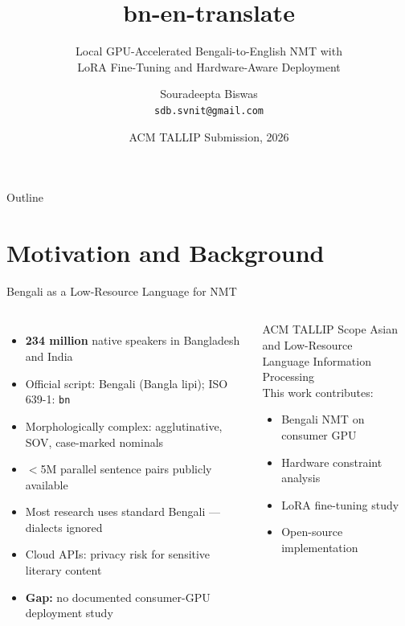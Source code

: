 \documentclass[aspectratio=169,10pt]{beamer}
\title{bn-en-translate}
\subtitle{Local GPU-Accelerated Bengali-to-English NMT with\\
LoRA Fine-Tuning and Hardware-Aware Deployment}
\author{Souradeepta Biswas \\ \texttt{sdb.svnit@gmail.com}}
\institute{M.S. Computer Science, Syracuse University \\ Independent Researcher}
\date{ACM TALLIP Submission, 2026}
\begin{document}
\begin{frame}
  \titlepage
\end{frame}

\begin{frame}{Outline}
  \tableofcontents
\end{frame}

\section{Motivation and Background}

\begin{frame}{Bengali as a Low-Resource Language for NMT}
  \begin{columns}
    \begin{itemize}
      \item \textbf{234 million} native speakers in Bangladesh and India
      \item Official script: Bengali (Bangla lipi); ISO 639-1: \texttt{bn}
      \item Morphologically complex: agglutinative, SOV, case-marked nominals
      \item $<$5M parallel sentence pairs publicly available
      \item Most research uses standard Bengali --- dialects ignored
      \item Cloud APIs: privacy risk for sensitive literary content
      \item \textbf{Gap:} no documented consumer-GPU deployment study
    \end{itemize}
    \begin{block}{ACM TALLIP Scope}
      Asian and Low-Resource\\
      Language Information Processing\\
      \vspace{0.2cm}
      This work contributes:\\
      \begin{itemize}\small
        \item Bengali NMT on consumer GPU
        \item Hardware constraint analysis
        \item LoRA fine-tuning study
        \item Open-source implementation
      \end{itemize}
    \end{block}
  \end{columns}
\end{frame}
\end{document}
